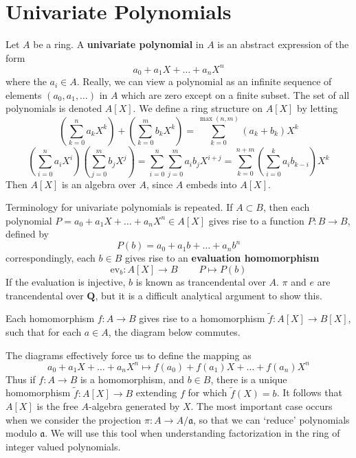 \section{Univariate Polynomials}

Let $A$ be a ring. A {\bf univariate polynomial} in $A$ is an abstract expression of the form
%
\[ a_0 + a_1 X + \dots + a_n X^n \]
%
where the $a_i \in A$. Really, we can view a polynomial as an infinite sequence of elements $(a_0, a_1, \dots)$ in $A$ which are zero except on a finite subset. The set of all polynomials is denoted $A[X]$. We define a ring structure on $A[X]$ by letting
%
\[ \left( \sum_{k = 0}^n a_k X^k \right) + \left( \sum_{k = 0}^m b_k X^k \right) = \sum_{k = 0}^{\max(n,m)} (a_k + b_k) X^k \]
%
\[ \left( \sum_{i = 0}^n a_i X^i \right) \left( \sum_{j = 0}^m b_j X^j \right) = \sum_{i = 0}^n \sum_{j = 0}^m a_i b_j X^{i + j} = \sum_{k = 0}^{n + m} \left( \sum_{i = 0}^k a_i b_{k - i} \right) X^k \]
%
Then $A[X]$ is an algebra over $A$, since $A$ embeds into $A[X]$.

Terminology for univariate polynomials is repeated. If $A \subset B$, then each polynomial $P = a_0 + a_1 X + \dots + a_n X^n \in A[X]$ gives rise to a function $P: B \to B$, defined by
%
\[ P(b) = a_0 + a_1 b + \dots + a_n b^n \]
%
correspondingly, each $b \in B$ gives rise to an {\bf evaluation homomorphism}
%
\[ \text{ev}_b: A[X] \to B\ \ \ \ \ \ \ \ \ \ P \mapsto P(b) \]
%
If the evaluation is injective, $b$ is known as trancendental over $A$. $\pi$ and $e$ are trancendental over $\mathbf{Q}$, but it is a difficult analytical argument to show this.

Each homomorphism $f: A \to B$ gives rise to a homomorphism $\tilde{f}: A[X] \to B[X]$, such that for each $a \in A$, the diagram below commutes.
%
\begin{center}
\end{center}
%
The diagrams effectively force us to define the mapping as
%
\[ a_0 + a_1 X + \dots + a_n X^n \mapsto f(a_0) + f(a_1) X + \dots + f(a_n) X^n \]
%
Thus if $f:A \to B$ is a homomorphism, and $b \in B$, there is a unique homomorphism $\tilde{f}: A[X] \to B$ extending $f$ for which $\tilde{f}(X) = b$. It follows that $A[X]$ is the free $A$-algebra generated by $X$. The most important case occurs when we consider the projection $\pi : A \to A/\mathfrak{a}$, so that we can `reduce' polynomials modulo $\mathfrak{a}$. We will use this tool when understanding factorization in the ring of integer valued polynomials.




